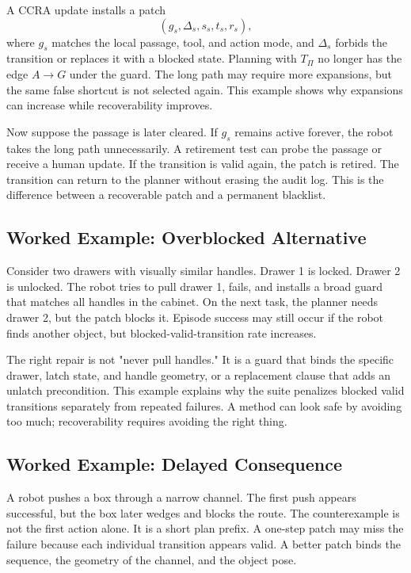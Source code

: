 \documentclass{article}
\newcommand{\ccra}{\textsc{CCRA}}
\newcommand{\guard}{g}
\newcommand{\patch}{\Delta}
\newcommand{\patched}{T_{\Pi}}
\begin{document}
A \ccra{} update installs a patch
\begin{equation}
    (\guard_s,\patch_s,s_s,t_s,r_s),
\end{equation}
where $\guard_s$ matches the local passage, tool, and action mode, and
$\patch_s$ forbids the transition or replaces it with a blocked state. Planning
with $\patched$ no longer has the edge $A \rightarrow G$ under the guard. The
long path may require more expansions, but the same false shortcut is not
selected again. This example shows why expansions can increase while
recoverability improves.

Now suppose the passage is later cleared. If $\guard_s$ remains active forever,
the robot takes the long path unnecessarily. A retirement test can probe the
passage or receive a human update. If the transition is valid again, the patch
is retired. The transition can return to the planner without erasing the audit
log. This is the difference between a recoverable patch and a permanent
blacklist.

\subsection{Worked Example: Overblocked Alternative}

Consider two drawers with visually similar handles. Drawer 1 is locked. Drawer
2 is unlocked. The robot tries to pull drawer 1, fails, and installs a broad
guard that matches all handles in the cabinet. On the next task, the planner
needs drawer 2, but the patch blocks it. Episode success may still occur if the
robot finds another object, but blocked-valid-transition rate increases.

The right repair is not "never pull handles." It is a guard that binds the
specific drawer, latch state, and handle geometry, or a replacement clause that
adds an unlatch precondition. This example explains why the suite penalizes
blocked valid transitions separately from repeated failures. A method can look
safe by avoiding too much; recoverability requires avoiding the right thing.

\subsection{Worked Example: Delayed Consequence}

A robot pushes a box through a narrow channel. The first push appears
successful, but the box later wedges and blocks the route. The counterexample
is not the first action alone. It is a short plan prefix. A one-step patch may
miss the failure because each individual transition appears valid. A better
patch binds the sequence, the geometry of the channel, and the object pose.
\end{document}
